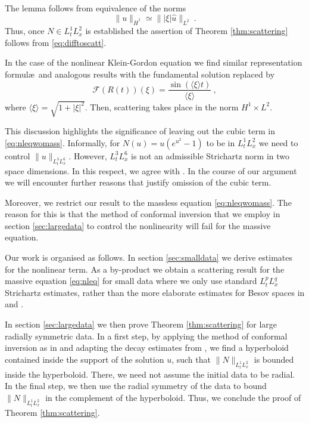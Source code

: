 \documentclass[a4paper]{amsart}
\providecommand{\abs}[1]{\lvert #1 \rvert}
\providecommand{\jap}[1]{\langle #1 \rangle}
\providecommand{\norm}[1]{\lVert #1 \rVert}
\begin{document}
The lemma follows from equivalence of the norms
\begin{equation*}
  \norm{u}_{\dot{H}^1} \simeq \norm{\abs{\xi} \hat{u}}_{L^2}\ .
\end{equation*}
Thus, once $N \in L^1_t L^2_x$ is established the assertion of Theorem
\ref{thm:scattering} follows from \eqref{eq:difftoscatt}.
\par
In the case of the nonlinear Klein-Gordon equation we find similar
representation formul\ae\ and analogous results with the fundamental
solution replaced by
\begin{equation*}
  {\mathcal{F}}(R(t))(\xi)
  =
  \frac{\sin(\jap{\xi} t)}{\jap{\xi}}\ ,
\end{equation*}
where $\jap{\xi} = \sqrt{1 + \abs{\xi}^2}$. Then, scattering takes
place in the norm $H^1 \times L^2$.

This discussion highlights the significance of leaving out the cubic
term in \eqref{eq:nleqwomass}. Informally, for $N(u) = u (e^{u^2} - 1)$ to
be in $L^1_t L^2_x$ we need to control $\norm{u}_{L^3_t L^6_x}$.
However, $L^3_t L^6_x$ is not an admissible Strichartz norm in two
space dimensions. In this respect, we agree with \cite{MR2569615}. In
the course of our argument we will encounter further reasons that
justify omission of the cubic term.
\par
Moreover, we restrict our result to the massless equation
\eqref{eq:nleqwomass}. The reason for this is that the method of
conformal inversion that we employ in section \ref{sec:largedata} to
control the nonlinearity will fail for the massive equation.

Our work is organised as follows.
In section \ref{sec:smalldata} we derive estimates for the nonlinear
term. As a by-product we obtain a scattering result for the massive
equation \eqref{eq:nleq} for small data where we only use standard $L^p_t
L^q_x$ Strichartz estimates, rather than the more elaborate estimates
for Besov spaces in \cite{MR1704989} and \cite{MR2569615}.
\par
In section \ref{sec:largedata} we then prove Theorem
\ref{thm:scattering} for large radially symmetric data.
In a first step, by applying the method of conformal inversion as in
\cite{MR1078267} and adapting the decay estimates from
\cite{Struwe10}, we find a hyperboloid contained inside the support of
the solution $u$, such that $\norm{N}_{L^1_t L^2_x}$ is bounded inside
the hyperboloid.
There, we need not assume the initial data to be radial.
In the final step, we then use the radial symmetry of the data to
bound $\norm{N}_{L^1_t L^2_x}$ in the complement of the hyperboloid.
Thus, we conclude the proof of Theorem \ref{thm:scattering}.
\end{document}
